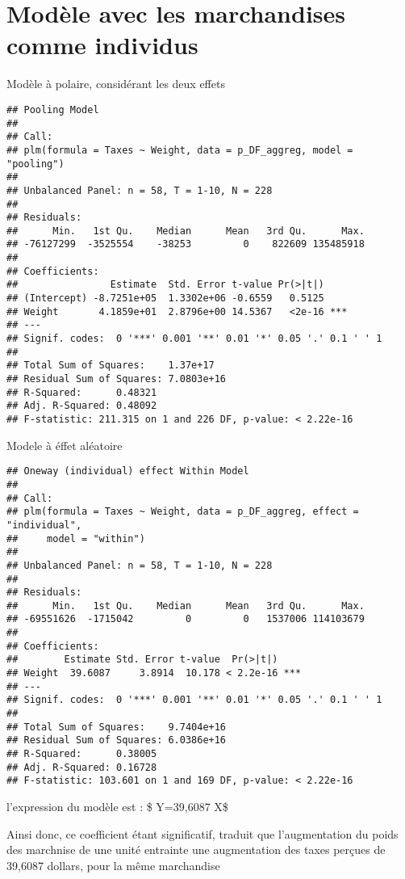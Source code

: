 \documentclass[
]{book}
\begin{document}
\hypertarget{moduxe8le-avec-les-marchandises-comme-individus}{%
\section{Modèle avec les marchandises comme individus}\label{moduxe8le-avec-les-marchandises-comme-individus}}

Modèle à polaire, considérant les deux effets

\begin{verbatim}
## Pooling Model
## 
## Call:
## plm(formula = Taxes ~ Weight, data = p_DF_aggreg, model = "pooling")
## 
## Unbalanced Panel: n = 58, T = 1-10, N = 228
## 
## Residuals:
##      Min.   1st Qu.    Median      Mean   3rd Qu.      Max. 
## -76127299  -3525554    -38253         0    822609 135485918 
## 
## Coefficients:
##                Estimate  Std. Error t-value Pr(>|t|)    
## (Intercept) -8.7251e+05  1.3302e+06 -0.6559   0.5125    
## Weight       4.1859e+01  2.8796e+00 14.5367   <2e-16 ***
## ---
## Signif. codes:  0 '***' 0.001 '**' 0.01 '*' 0.05 '.' 0.1 ' ' 1
## 
## Total Sum of Squares:    1.37e+17
## Residual Sum of Squares: 7.0803e+16
## R-Squared:      0.48321
## Adj. R-Squared: 0.48092
## F-statistic: 211.315 on 1 and 226 DF, p-value: < 2.22e-16
\end{verbatim}

Modele à éffet aléatoire

\begin{verbatim}
## Oneway (individual) effect Within Model
## 
## Call:
## plm(formula = Taxes ~ Weight, data = p_DF_aggreg, effect = "individual", 
##     model = "within")
## 
## Unbalanced Panel: n = 58, T = 1-10, N = 228
## 
## Residuals:
##      Min.   1st Qu.    Median      Mean   3rd Qu.      Max. 
## -69551626  -1715042         0         0   1537006 114103679 
## 
## Coefficients:
##        Estimate Std. Error t-value  Pr(>|t|)    
## Weight  39.6087     3.8914  10.178 < 2.2e-16 ***
## ---
## Signif. codes:  0 '***' 0.001 '**' 0.01 '*' 0.05 '.' 0.1 ' ' 1
## 
## Total Sum of Squares:    9.7404e+16
## Residual Sum of Squares: 6.0386e+16
## R-Squared:      0.38005
## Adj. R-Squared: 0.16728
## F-statistic: 103.601 on 1 and 169 DF, p-value: < 2.22e-16
\end{verbatim}

l'expression du modèle est : \$ Y=39,6087 X\$

Ainsi donc, ce coefficient étant significatif, traduit que l'augmentation du poids des marchnise de une unité entrainte une augmentation des taxes perçues de 39,6087 dollars, pour la même marchandise
\end{document}
